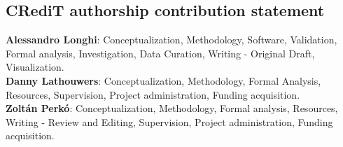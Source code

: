 \subsection{CRediT authorship contribution statement}
\textbf{Alessandro Longhi}: Conceptualization, Methodology, Software, Validation, Formal analysis, Investigation, Data Curation, Writing - Original Draft, Visualization. \\
\textbf{Danny Lathouwers}: Conceptualization, Methodology, Formal Analysis, Resources, Supervision, Project administration, Funding acquisition.\\
\textbf{Zoltán Perkó}: Conceptualization, Methodology, Formal analysis, Resources, Writing - Review and Editing, Supervision, Project administration, Funding acquisition.